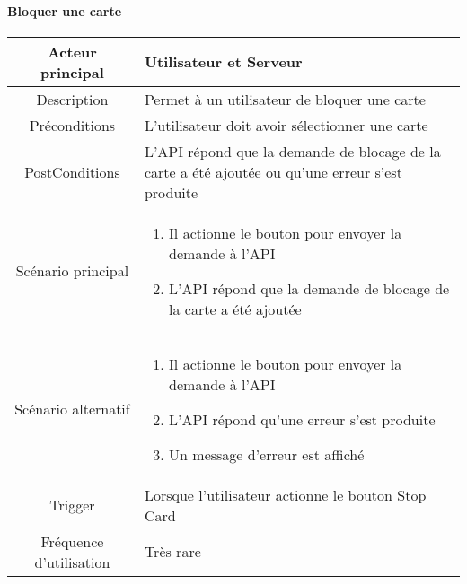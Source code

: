 \documentclass{article}
\begin{document}
    \newpage

\paragraph{Bloquer une carte}
    \begin{table}[h]
        \begin{tabular}{|c|p{10cm}|}
        \hline
        Acteur principal& Utilisateur et Serveur    \\
        \hline
        Description&  Permet à un utilisateur de bloquer une carte  \\
        \hline
        Préconditions&    L'utilisateur doit avoir sélectionner une carte  \\
        \hline
        PostConditions&  L'API répond que la demande de blocage de la carte a été ajoutée ou qu'une erreur s'est produite    \\
        \hline
        Scénario principal& 
                \begin{enumerate}
                    \item Il actionne le bouton pour envoyer la demande à l'API
                    \item L'API répond que la demande de blocage de la carte a été ajoutée
                \end{enumerate}     \\
        \hline
        Scénario alternatif&  
        \begin{enumerate}
            \item Il actionne le bouton pour envoyer la demande à l'API
            \item L'API répond qu'une erreur s'est produite
            \item Un message d'erreur est affiché
        \end{enumerate}    \\
        \hline
        Trigger&   Lorsque l'utilisateur actionne le bouton Stop Card   \\
        \hline
        Fréquence d'utilisation&    Très rare  \\
        \hline
        \end{tabular}
    \end{table}

\newpage
\end{document}
